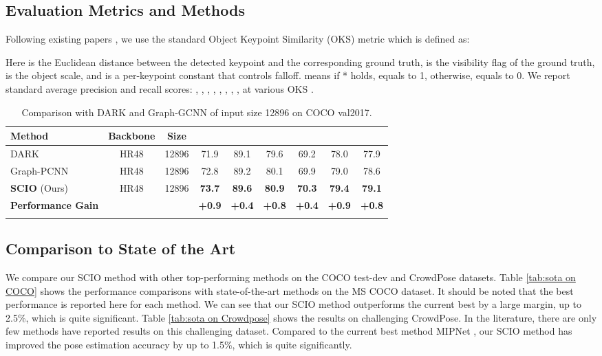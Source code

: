 \documentclass[runningheads]{llncs}
\begin{document}
\subsection{Evaluation Metrics and Methods}
Following existing papers \cite{DBLP:conf/cvpr/0009XLW19}, we use the standard  Object Keypoint Similarity (OKS) metric which is defined as: 

Here  is the Euclidean distance between the detected keypoint and the corresponding ground truth,  is the visibility flag of the ground truth,  is the object scale, and  is a per-keypoint constant that controls falloff.  means if * holds,  equals to 1, otherwise,  equals to 0. We report standard average precision and recall scores:   , , , , , , , ,  at various OKS \cite{Geng_2021_CVPR,DBLP:conf/cvpr/0009XLW19}.


\begin{table}
\begin{center}
\caption{
Comparison with DARK and Graph-GCNN of input size 12896 on COCO val2017.
}
\label{tab:inputsize}
\begin{tabular}{l|cccccccc}
\hline\noalign{\smallskip}
Method & Backbone & Size & \text{} &  &  &   &  &   \\
\hline\noalign{\smallskip}
DARK \cite{DBLP:conf/cvpr/ZhangZD0Z20} &  HR48& 12896 &71.9&  89.1 & 79.6 & 69.2 & 78.0  &77.9\\
Graph-PCNN \cite{DBLP:conf/eccv/WangLGDW20}& HR48& 12896& 72.8& 89.2& 80.1& 69.9 &79.0 &78.6\\
\hline\noalign{\smallskip}
\textbf{SCIO} (Ours) & HR48& 12896& \textbf{73.7}& \textbf{89.6}& \textbf{80.9} & \textbf{70.3}& \textbf{79.4} & \textbf{79.1}\\
\textbf{Performance Gain} &   &   & \textbf{+0.9} & \textbf{+0.4}  & \textbf{+0.8} & \textbf{+0.4}& \textbf{+0.9} & \textbf{+0.8}\\
\hline\noalign{\smallskip}
\end{tabular}
\end{center}
\end{table}
\vspace{-1cm}

\subsection{Comparison to State of the Art}
We compare our SCIO method with other top-performing methods on the COCO test-dev and CrowdPose datasets. Table \ref{tab:sota on COCO} shows the performance comparisons with state-of-the-art methods on the MS COCO dataset. It should be noted that the best performance is reported here for each method. We can see that our SCIO method outperforms the current best by a large margin, up to 2.5\%, which is quite significant. 
Table \ref{tab:sota on Crowdpose} shows the results on challenging CrowdPose. In the literature, there are only few methods have reported results on this challenging dataset. Compared to the current best method MIPNet \cite{Khirodkar_2021_ICCV}, our SCIO method has improved the pose estimation accuracy by up to 1.5\%, which is quite significantly.
\end{document}
